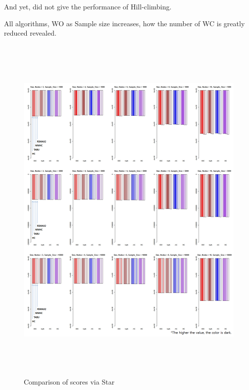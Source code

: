 And yet, did not give the performance of Hill-climbing.

All algorithms, WO as Sample size increases, how the number of WC is greatly reduced revealed.
	
	\begin{figure}[p]
	\centering
		\includegraphics[height=500pt]{03_Star_Score}
		\caption{Comparison of scores via Star}
	\end{figure}	

